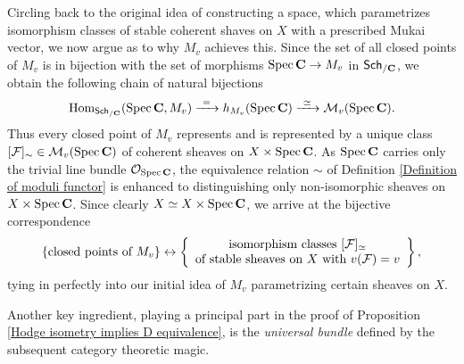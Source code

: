 Circling back to the original idea of constructing a space, which parametrizes isomorphism classes of stable coherent shaves on $X$ with a prescribed Mukai vector, we now argue as to why $M_v$ achieves this. Since the set of all closed points of $M_v$ is in bijection with the set of morphisms $\operatorname{Spec}\mathbf C \to M_v$ in $\mathsf{Sch}_{/\mathbf C}$, we obtain the following chain of natural bijections
\begin{equation}
    \label{eq: natural iso applied to SpecC}
    \operatorname{Hom}_{\mathsf{Sch}_{/\mathbf C}}(\operatorname{Spec}\mathbf C, M_v) \xrightarrow{\ = \ } h_{M_v}(\operatorname{Spec}\mathbf C) \xrightarrow{\ \simeq \ } \mathcal M_v(\operatorname{Spec}\mathbf C).
\end{equation}
Thus every closed point of $M_v$ represents and is represented by a unique class $[\mathcal F]_\sim \in \mathcal M_v(\operatorname{Spec}\mathbf C)$ of coherent sheaves on $X \times \operatorname{Spec}\mathbf C$. As $\operatorname{Spec}\mathbf C$ carries only the trivial line bundle ${\mathcal{O}_{\operatorname{Spec}\mathbf C}}$, the equivalence relation $\sim$ of Definition \ref{Definition of moduli functor} is enhanced to distinguishing only non-isomorphic sheaves on $X \times \operatorname{Spec}\mathbf C$. Since clearly $X \simeq X \times \operatorname{Spec}\mathbf C$, we arrive at the bijective correspondence
\begin{equation}
    \label{eq: closed points of M}
    \{ \text{closed points of $M_v$}\} 
    \leftrightarrow \left\{
        \begin{array}{c}
            \text{isomorphism classes $[\mathcal F]_\simeq$} \\
            \text{of stable sheaves on $X$ with $v(\mathcal F) = v$}
        \end{array}
        \right\},
\end{equation}
tying in perfectly into our initial idea of $M_v$ parametrizing certain sheaves on $X$.  

Another key ingredient, playing a principal part in the proof of Proposition \ref{Hodge isometry implies D equivalence}, is the \emph{universal bundle} defined by the subsequent category theoretic magic.


